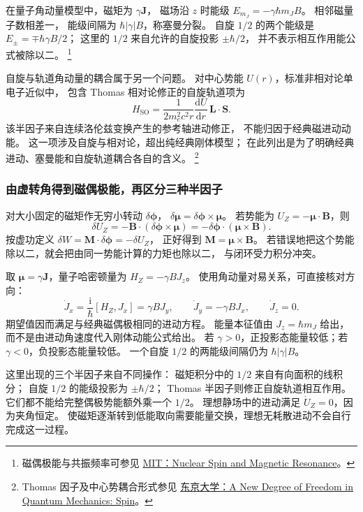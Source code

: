 \documentclass[UTF8,zihao=-4,fontset=fandol,a4paper]{ctexart}
\newcommand{\vect}[1]{\bm{#1}}
\newcommand{\dd}{\mathrm d}
\begin{document}
在量子角动量模型中，磁矩为 $\gamma\vect J$，
磁场沿 $z$ 时能级
$E_{m_J}=-\gamma\hbar m_JB$。
相邻磁量子数相差一，
能级间隔为 $\hbar|\gamma|B$，称塞曼分裂。
自旋 $1/2$ 的两个能级是
$E_\pm=\mp\hbar\gamma B/2$；
这里的 $1/2$ 来自允许的自旋投影 $\pm\hbar/2$，
并不表示相互作用能公式被除以二。
\footnote{磁偶极能与共振频率可参见
\href{https://ocw.mit.edu/courses/22-920-a-hands-on-introduction-to-nuclear-magnetic-resonance-january-iap-1997/38a44e04e8f48b1a8969b3a2e5fb6363_lecture_1.pdf}{MIT：Nuclear Spin and Magnetic Resonance}。}

自旋与轨道角动量的耦合属于另一个问题。
对中心势能 $U(r)$，标准非相对论单电子近似中，
包含 Thomas 相对论修正的自旋轨道项为
\[
H_{\text{SO}}=\frac{1}{2m_e^2c^2r}\frac{\dd U}{\dd r}\,
\vect L\cdot\vect S.
\]
该半因子来自连续洛伦兹变换产生的参考轴进动修正，
不能归因于经典磁进动动能。
这一项涉及自旋与相对论，超出纯经典刚体模型；
在此列出是为了明确经典进动、塞曼能和自旋轨道耦合各自的含义。
\footnote{Thomas 因子及中心势耦合形式参见
\href{https://ocw.u-tokyo.ac.jp/lecture_files/engin_06/6/notes/en/4-1E.PDF}{东京大学：A New Degree of Freedom in Quantum Mechanics: Spin}。}


\subsubsection*{由虚转角得到磁偶极能，再区分三种半因子}
对大小固定的磁矩作无穷小转动 $\delta\vect\phi$，
$\delta\vect\mu=\delta\vect\phi\times\vect\mu$。
若势能为 $U_Z=-\vect\mu\cdot\vect B$，则
\[
\delta U_Z=-\vect B\cdot(\delta\vect\phi\times\vect\mu)
=-\delta\vect\phi\cdot(\vect\mu\times\vect B).
\]
按虚功定义 $\delta W=\vect M\cdot\delta\vect\phi=-\delta U_Z$，
正好得到 $\vect M=\vect\mu\times\vect B$。
若错误地把这个势能除以二，就会把由同一势能计算的力矩也除以二，
与闭环受力积分冲突。

取 $\vect\mu=\gamma\vect J$，量子哈密顿量为 $H_Z=-\gamma BJ_z$。
使用角动量对易关系，可直接核对方向：
\[
\dot J_x=\frac{\mathrm i}{\hbar}[H_Z,J_x]=\gamma BJ_y,
\qquad
\dot J_y=-\gamma BJ_x,\qquad \dot J_z=0.
\]
期望值因而满足与经典磁偶极相同的进动方程。
能量本征值由 $J_z=\hbar m_J$ 给出，
而不是由进动角速度代入刚体动能公式给出。
若 $\gamma>0$，正投影态能量较低；若 $\gamma<0$，负投影态能量较低。
一个自旋 $1/2$ 的两能级间隔仍为 $\hbar|\gamma|B$。

这里出现的三个半因子来自不同操作：
磁矩积分中的 $1/2$ 来自有向面积的线积分；
自旋 $1/2$ 的能级投影为 $\pm\hbar/2$；
Thomas 半因子则修正自旋轨道相互作用。
它们都不能给完整偶极势能额外乘一个 $1/2$。
理想静场中的进动满足 $\dot U_Z=0$，因为夹角恒定。
使磁矩逐渐转到低能取向需要能量交换，理想无耗散进动不会自行完成这一过程。
\end{document}
